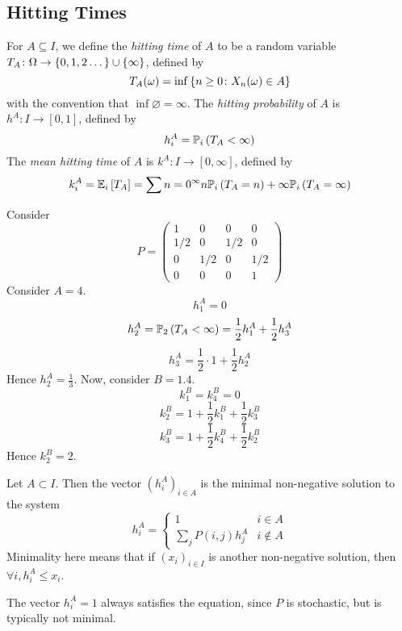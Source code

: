 \subsection{Hitting Times}
\begin{definition}
	For \( A \subseteq I \), we define the \textit{hitting time} of \( A \) to be a random variable \( T_A \colon \Omega \to \qty{0,1,2\dots} \cup \{ \infty \} \), defined by
	\[
		T_A(\omega) = \inf \qty{n \geq 0 \colon X_n(\omega) \in A}
	\]
	with the convention that \( \inf \varnothing = \infty \).
	The \textit{hitting probability} of \( A \) is \( h^A \colon I \to [0,1] \), defined by
	\[
		h_i^A = \mathbb{P}_{i}\left({T_A < \infty}\right)
	\]
	The \textit{mean hitting time} of \( A \) is \( k^A \colon I \to [0,\infty] \), defined by
	\[
		k_i^A = \mathbb{E}_{i}\left[{T_A}\right] = \sum{n=0}^\infty n \mathbb{P}_{i}\left({T_A = n}\right) + \infty \mathbb{P}_{i}\left({T_A = \infty}\right)
	\]
\end{definition}
\begin{example}
	Consider
	\[
		P = \begin{pmatrix}
			1   & 0   & 0   & 0   \\
			1/2 & 0   & 1/2 & 0   \\
			0   & 1/2 & 0   & 1/2 \\
			0   & 0   & 0   & 1
		\end{pmatrix}
	\]
	Consider \( A = \qty{4} \).
	\[
		h_1^A = 0
	\]
	\[
		h_2^A = \mathbb{P}_{2}\left({T_A < \infty}\right) = \frac{1}{2} h_1^A + \frac{1}{2} h_3^A
	\]
	\[
		h_3^A = \frac{1}{2} \cdot 1 + \frac{1}{2} h_2^A
	\]
	Hence \( h_2^A = \frac{1}{3} \).
	Now, consider \( B = \qty{1,4} \).
	\[
		k_1^B = k_4^B = 0
	\]
	\[
		k_2^B = 1 + \frac{1}{2} k_1^B + \frac{1}{2} k_3^B
	\]
	\[
		k_3^B = 1 + \frac{1}{2} k_4^B + \frac{1}{2} k_2^B
	\]
	Hence \( k_2^B = 2 \).
\end{example}
\begin{theorem}
	Let \( A \subset I \).
	Then the vector \( (h_i^A)_{i \in A} \) is the minimal non-negative solution to the system
	\[
		h_i^A = \begin{cases}
			1                   & i \in A     \\
			\sum_j P(i,j) h_j^A & i \not\in A\end{cases}
	\]
	Minimality here means that if \( (x_i)_{i \in I} \) is another non-negative solution, then \( \forall i, h_i^A \leq x_i \).
\end{theorem}
\begin{note}
	The vector \( h_i^A = 1 \) always satisfies the equation, since \( P \) is stochastic, but is typically not minimal.
\end{note}
